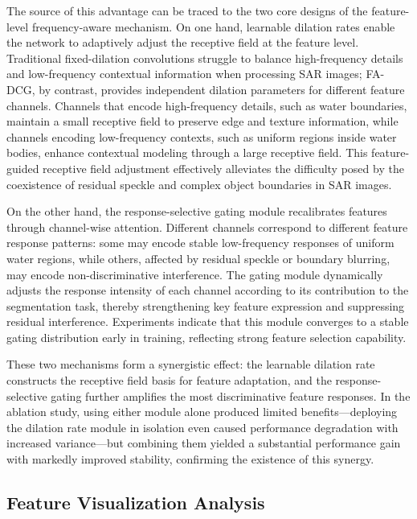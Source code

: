 \documentclass[lettersize,journal]{IEEEtran}
\begin{document}
The source of this advantage can be traced to the two core designs of the feature-level frequency-aware mechanism. On one hand, learnable dilation rates enable the network to adaptively adjust the receptive field at the feature level. Traditional fixed-dilation convolutions struggle to balance high-frequency details and low-frequency contextual information when processing SAR images; FA-DCG, by contrast, provides independent dilation parameters for different feature channels. Channels that encode high-frequency details, such as water boundaries, maintain a small receptive field to preserve edge and texture information, while channels encoding low-frequency contexts, such as uniform regions inside water bodies, enhance contextual modeling through a large receptive field. This feature-guided receptive field adjustment effectively alleviates the difficulty posed by the coexistence of residual speckle and complex object boundaries in SAR images.

On the other hand, the response-selective gating module recalibrates features through channel-wise attention. Different channels correspond to different feature response patterns: some may encode stable low-frequency responses of uniform water regions, while others, affected by residual speckle or boundary blurring, may encode non-discriminative interference. The gating module dynamically adjusts the response intensity of each channel according to its contribution to the segmentation task, thereby strengthening key feature expression and suppressing residual interference. Experiments indicate that this module converges to a stable gating distribution early in training, reflecting strong feature selection capability.

These two mechanisms form a synergistic effect: the learnable dilation rate constructs the receptive field basis for feature adaptation, and the response-selective gating further amplifies the most discriminative feature responses. In the ablation study, using either module alone produced limited benefits---deploying the dilation rate module in isolation even caused performance degradation with increased variance---but combining them yielded a substantial performance gain with markedly improved stability, confirming the existence of this synergy.

\subsection{Feature Visualization Analysis}
\end{document}
